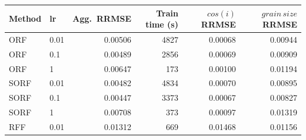 \begin{tabular}{llrrrr}
\toprule
Method & lr & Agg.\ RRMSE & Train time (s) & $cos(i)$ RRMSE & $grain\,size$ RRMSE \\
\midrule
ORF & 0.01 & 0.00506 & 4827 & 0.00068 & 0.00944 \\
ORF & 0.1 & 0.00489 & 2856 & 0.00069 & 0.00909 \\
ORF & 1 & 0.00647 & 173 & 0.00100 & 0.01194 \\
SORF & 0.01 & 0.00482 & 4834 & 0.00070 & 0.00895 \\
SORF & 0.1 & 0.00447 & 3373 & 0.00067 & 0.00827 \\
SORF & 1 & 0.00708 & 373 & 0.00097 & 0.01319 \\
RFF & 0.01 & 0.01312 & 669 & 0.01468 & 0.01156 \\
\bottomrule
\end{tabular}
